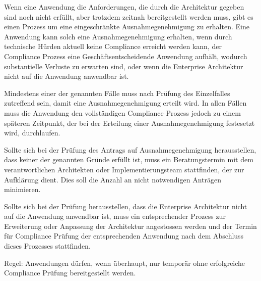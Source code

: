 Wenn eine Anwendung die Anforderungen, die durch die Architektur gegeben sind noch nicht erfüllt, aber trotzdem zeitnah bereitgestellt werden muss, gibt es einen Prozess um eine eingeschränkte Ausnahmegenehmigung zu erhalten. Eine Anwendung kann solch eine Ausnahmegenehmigung erhalten, wenn durch technische Hürden aktuell keine Compliance erreicht werden kann, der Compliance Prozess eine Geschäftsentscheidende Anwendung aufhält, wodurch substantielle Verluste zu erwarten sind, oder wenn die Enterprise Architektur nicht auf die Anwendung anwendbar ist. 

Mindestens einer der genannten Fälle muss nach Prüfung des Einzelfalles zutreffend sein, damit eine Ausnahmegenehmigung erteilt wird. In allen Fällen muss die Anwendung den vollständigen Compliance Prozess jedoch zu einem späteren Zeitpunkt, der bei der Erteilung einer Ausnahmegenehmigung festesetzt wird, durchlaufen. 

Sollte sich bei der Prüfung des Antrags auf Ausnahmegenehmigung herausstellen, dass keiner der genannten Gründe erfüllt ist, muss ein Beratungstermin mit dem verantwortlichen Architekten oder Implementierungsteam stattfinden, der zur Aufklärung dient. Dies soll die Anzahl an nicht notwendigen Anträgen minimieren. 

Sollte sich bei der Prüfung herausstellen, dass die Enterprise Architektur nicht auf die Anwendung anwendbar ist, muss ein entsprechender Prozess zur Erweiterung oder Anpassung der Architektur angestossen werden und der Termin für Compliance Prüfung der entsprechenden Anwendung nach dem Abschluss dieses Prozesses stattfinden.

Regel: Anwendungen dürfen, wenn überhaupt, nur temporär ohne erfolgreiche Compliance Prüfung bereitgestellt werden.